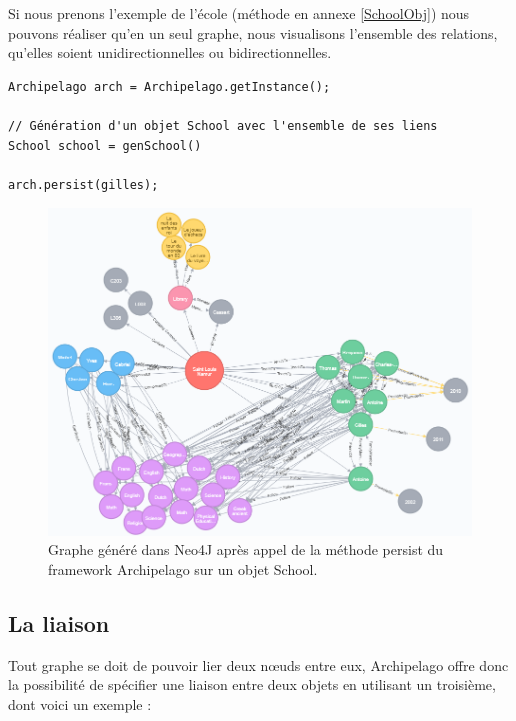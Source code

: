 \documentclass[a4paper,fleqn,12pt,oneside]{report}
\begin{document}
Si nous prenons l'exemple de l'école (méthode en annexe \ref{SchoolObj}) nous pouvons réaliser qu'en un seul graphe, nous visualisons l'ensemble des relations, qu'elles soient unidirectionnelles ou bidirectionnelles.
\newpage

\begin{lstlisting}
Archipelago arch = Archipelago.getInstance();

// Génération d'un objet School avec l'ensemble de ses liens
School school = genSchool()

arch.persist(gilles);
\end{lstlisting}

\begin{figure}[!ht]
\centering
\includegraphics[scale=0.9]{figures/ecoleNeo4J.png}
\caption{Graphe généré dans Neo4J après appel de la méthode persist du framework Archipelago sur un objet School.}
\label{fig:ecoleNeo4J}
\end{figure}

\newpage
\subsection{La liaison}

Tout graphe se doit de pouvoir lier deux nœuds entre eux, Archipelago offre donc la possibilité de spécifier une liaison entre deux objets en utilisant un troisième, dont voici un exemple : 
\end{document}
